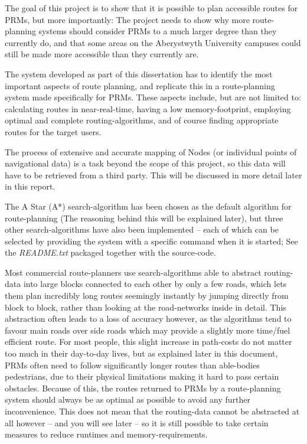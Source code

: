 
The goal of this project is to show that it is possible to plan accessible routes for PRMs, but more importantly: The project needs to show why more route-planning systems should consider PRMs to a much larger degree than they currently do, and that some areas on the Aberystwyth University campuses could still be made more accessible than they currently are.

The system developed as part of this dissertation has to identify the most important aspects of route planning, and replicate this in a route-planning system made specifically for PRMs.
These aspects include, but are not limited to: calculating routes in near-real-time, having a low memory-footprint, employing optimal and complete routing-algorithms, and of course finding appropriate routes for the target users.

The process of extensive and accurate mapping of Nodes (or individual points of navigational data) is a task beyond the scope of this project, so this data will have to be retrieved from a third party. This will be discussed in more detail later in this report.

The A Star (A*) search-algorithm has been chosen as the default algorithm for route-planning (The reasoning behind this will be explained later), but three other search-algorithms have also been implemented -- each of which can be selected by providing the system with a specific command when it is started; See the \textit{README.txt} packaged together with the source-code. 

Most commercial route-planners use search-algorithms able to abstract routing-data into large blocks connected to each other by only a few roads, which lets them plan incredibly long routes seemingly instantly by jumping directly from block to block, rather than looking at the road-networks inside in detail. This abstraction often leads to a loss of accuracy however, as the algorithms tend to favour main roads over side roads which may provide a slightly more time/fuel efficient route. For most people, this slight increase in path-costs do not matter too much in their day-to-day lives, but as explained later in this document, PRMs often need to follow significantly longer routes than able-bodies pedestrians, due to their physical limitations making it hard to pass certain obstacles. Because of this, the routes returned to PRMs by a route-planning system should always be as optimal as possible to avoid any further inconvenience. This does not mean that the routing-data cannot be abstracted at all however -- and you will see later -- so it is still possible to take certain measures to reduce runtimes and memory-requirements.

